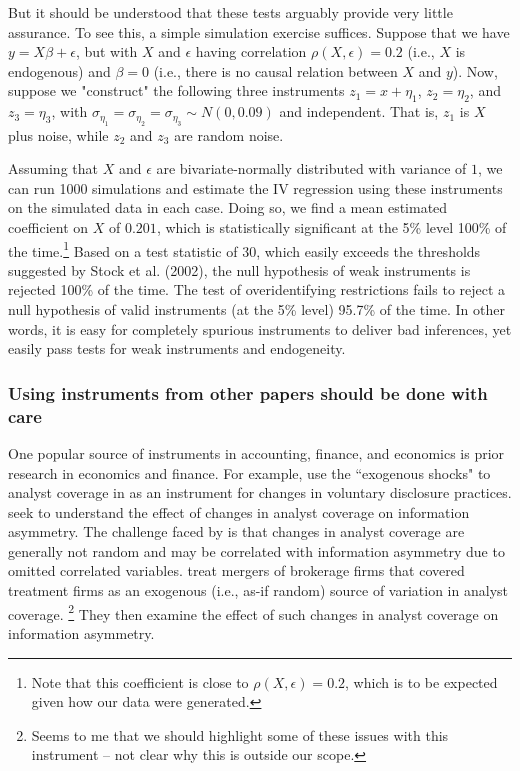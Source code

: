 \documentclass[11pt]{amsart}
\begin{document}
But it should be understood that these tests arguably provide very little assurance.
To see this, a simple simulation exercise suffices.
Suppose that we have $y = X \beta + \epsilon$, but with $X$ and $\epsilon$ having correlation $\rho(X, \epsilon) = 0.2$ (i.e., $X$ is endogenous) and $\beta = 0$ (i.e., there is no causal relation between $X$ and $y$). 
Now, suppose we "construct" the following three instruments 
$z_1 = x +\eta_1$, $z_2 = \eta_2$, and $z_3 = \eta_3$, with $\sigma_{\eta_1} = \sigma_{\eta_2} = \sigma_{\eta_3} \sim N(0, 0.09)$ and independent. 
That is, $z_1$ is $X$ plus noise, while $z_2$ and $z_3$ are random noise.

Assuming that $X$ and $\epsilon$ are bivariate-normally distributed with variance of $1$, we can run 1000 simulations and  estimate the IV regression using these instruments on the simulated data in each case. Doing so, we find a mean estimated coefficient on $X$ of $0.201$, which is statistically significant at the 5\% level 100\% of the time.\footnote{Note that this coefficient is close to $\rho(X, \epsilon) = 0.2$, which is to be expected given how our data were generated.} Based on a test statistic of 30, which easily exceeds the thresholds suggested by Stock et al. (2002), the null hypothesis of weak instruments is rejected 100\% of the time. 
The test of overidentifying restrictions fails to reject a null hypothesis of valid instruments (at the 5\% level) 95.7\% of the time.
In other words, it is easy for completely spurious instruments to deliver bad inferences, yet easily pass tests for weak instruments and endogeneity.

\subsubsection{Using instruments from other papers should be done with care}
One popular source of instruments in accounting, finance, and economics is prior research in economics and finance.
For example, \citet{Balakrishnan:2014js} use the ``exogenous shocks" to analyst coverage in \citet{Kelly:2012ih} as an instrument for changes in voluntary disclosure practices. 
\citet{Kelly:2012ih} seek to understand the effect of changes in analyst coverage on information asymmetry. 
The challenge faced by \citet{Kelly:2012ih} is that changes in analyst coverage are generally not random and may be correlated with information asymmetry due to omitted correlated variables.
\citet{Kelly:2012ih} treat mergers of brokerage firms that covered treatment firms as an exogenous (i.e., as-if random) source of variation in analyst coverage. \footnote {Seems to me that we should highlight some of these issues with this instrument -- not clear why this is outside our scope.} They then examine the effect of such changes in analyst coverage on information asymmetry.
\end{document}

